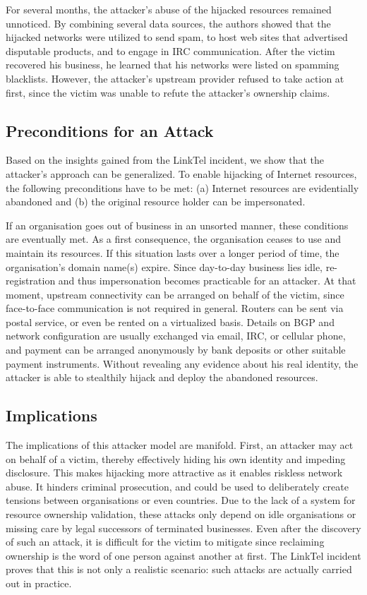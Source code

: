 \documentclass{llncs}
\begin{document}
For several months, the attacker's abuse of the hijacked resources remained
unnoticed.  By combining several data sources, 
the authors showed that the hijacked networks were utilized to send spam, to
host web sites that advertised disputable products, and to engage in IRC
communication.  After the victim recovered his business, he learned that his
networks were listed on spamming blacklists. However, the attacker's upstream
provider refused to take action at first, since the victim was unable to refute
the attacker's ownership claims. 


\subsection{Preconditions for an Attack} Based on the insights gained from the
LinkTel incident, we show that the attacker's approach can be generalized.  To
enable hijacking of Internet resources, the following preconditions have to be
met: (a) Internet resources are evidentially abandoned and (b) the original
resource holder can be impersonated.

If an organisation goes out of business in an unsorted manner, these conditions
are eventually met. As a first consequence, the organisation ceases to use and
maintain its resources. If this situation lasts over a longer period of time,
the organisation's domain name(s) expire. Since day-to-day business lies idle,
re-registration and thus impersonation becomes practicable for an attacker. At
that moment, upstream connectivity can be arranged on behalf of the victim,
since face-to-face communication is not required in general. Routers can be
sent via postal service, or even be rented on a virtualized basis. Details on
BGP and network configuration are usually exchanged via email, IRC, or cellular
phone, and payment can be arranged anonymously by bank deposits or other
suitable payment instruments. Without revealing any evidence about his real
identity, the attacker is able to stealthily hijack and deploy the abandoned
resources.


\subsection{Implications} The implications of this attacker model are manifold.
First, an attacker may act on behalf of a victim, thereby effectively hiding
his own identity and impeding disclosure. This makes hijacking more attractive
as it enables riskless network abuse. It hinders criminal prosecution, and
could be used to deliberately create tensions between organisations or even
countries. Due to the lack of a system for resource ownership validation, these
attacks only depend on idle organisations or missing care by legal successors
of terminated businesses. Even after the discovery of such an attack, it is
difficult for the victim to mitigate since reclaiming ownership is the word of
one person against another at first. The LinkTel incident \cite{ashijack}
proves that this is not only a realistic scenario: such attacks are actually
carried out in practice.
\end{document}
